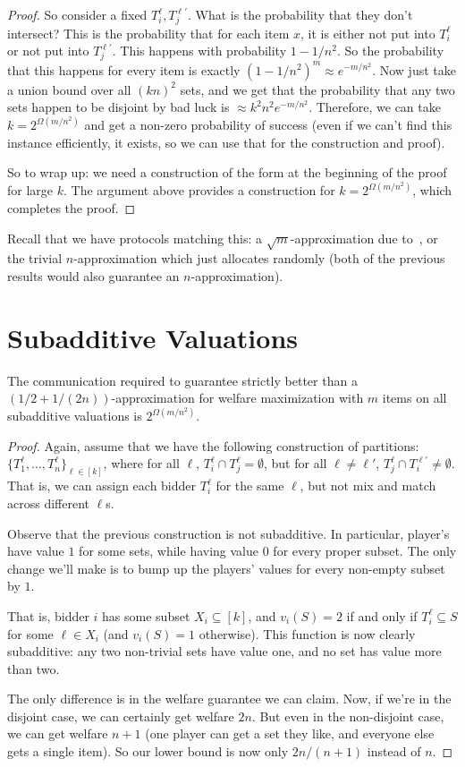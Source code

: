 \begin{proof}
So consider a fixed $T_i^\ell, T_j^{\ell'}$. What is the probability that they don't intersect? This is the probability that for each item $x$, it is either not put into $T_i^\ell$ or not put into $T_j^{\ell'}$. This happens with probability $1-1/n^2$. So the probability that this happens for every item is exactly $(1-1/n^2)^m \approx e^{-m/n^2}$. Now just take a union bound over all $(kn)^2$ sets, and we get that the probability that any two sets happen to be disjoint by bad luck is $\approx k^2n^2 e^{-m/n^2}$. Therefore, we can take $k = 2^{\Omega(m/n^2)}$ and get a non-zero probability of success (even if we can't find this instance efficiently, it exists, so we can use that for the construction and proof). 

So to wrap up: we need a construction of the form at the beginning of the proof for large $k$. The argument above provides a construction for $k = 2^{\Omega(m/n^2)}$, which completes the proof. 
\end{proof}

Recall that we have protocols matching this: a $\sqrt{m}$-approximation due to~\cite{LaviS05, DobzinskiNS05}, or the trivial $n$-approximation which just allocates randomly (both of the previous results would also guarantee an $n$-approximation). 

\section{Subadditive Valuations}
\begin{theorem}The communication required to guarantee strictly better than a $(1/2+1/(2n))$-approximation for welfare maximization with $m$ items on all subadditive valuations is $2^{\Omega(m/n^2)}$.
\end{theorem}
\begin{proof} Again, assume that we have the following construction of partitions: $\{T_1^\ell,\ldots, T_n^\ell\}_{\ell \in [k]}$, where for all $\ell$, $T_i^\ell \cap T_j^\ell = \emptyset$, but for all $\ell \neq \ell'$, $T_j^\ell \cap T_i^{\ell'} \neq \emptyset$. That is, we can assign each bidder $T_i^\ell$ for the same $\ell$, but not mix and match across different $\ell$s.

Observe that the previous construction is not subadditive. In particular, player's have value $1$ for some sets, while having value $0$ for every proper subset. The only change we'll make is to bump up the players' values for every non-empty subset by $1$. 

That is, bidder $i$ has some subset $X_i \subseteq [k]$, and $v_i(S) = 2$ if and only if $T_i^\ell \subseteq S$ for some $\ell \in X_i$ (and $v_i(S) = 1$ otherwise). This function is now clearly subadditive: any two non-trivial sets have value one, and no set has value more than two. 

The only difference is in the welfare guarantee we can claim. Now, if we're in the disjoint case, we can certainly get welfare $2n$. But even in the non-disjoint case, we can get welfare $n+1$ (one player can get a set they like, and everyone else gets a single item). So our lower bound is now only $2n/(n+1)$ instead of $n$. 
\end{proof}

